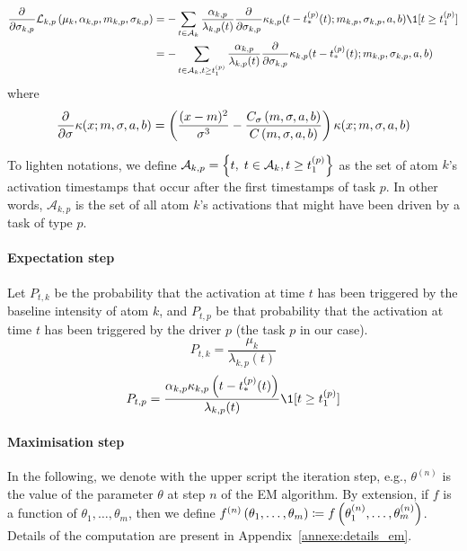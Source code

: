 \begin{equation}
\begin{split}
    \partiald{}{\sigma_{k,p}}\mathcal{L}_{k,p}\pars{\mu_k, \alpha_{k,p}, m_{k,p}, \sigma_{k,p}} &= -\sum_{t\in\mathcal{A}_k}\frac{\alpha_{k,p}}{\lambda_{k,p}(t)}\partiald{}{\sigma_{k,p}}\kappa_{k,p}(t - t_*^{(p)}(t); m_{k,p}, \sigma_{k,p}, a, b)\1[t \geq t_1^{(p)}] \\
    &= -\sum_{t\in\mathcal{A}_k, t \geq t_1^{(p)}}\frac{\alpha_{k,p}}{\lambda_{k,p}(t)}\partiald{}{\sigma_{k,p}}\kappa_{k,p}(t - t_*^{(p)}(t); m_{k,p}, \sigma_{k,p}, a, b)
\end{split}
\end{equation}
where
\begin{equation}
    \frac{\partial^{}}{\partial {\sigma}^{}}\kappa(x ; m, \sigma, a, b) = \left( \frac{(x-m)^2}{\sigma^3} - \frac{C_\sigma\left( m, \sigma,a,b \right)}{C\left( m, \sigma,a,b \right)} \right)\kappa(x ; m, \sigma, a, b)
\end{equation}

To lighten notations, we define $\mathcal{A}_{k,p} = \left\lbrace t,\; t\in\mathcal{A}_k, t \geq t_1^{(p)} \right\rbrace$ as the set of atom $k$'s activation timestamps that occur after the first timestamps of task $p$.
In other words, $\mathcal{A}_{k,p}$ is the set of all atom $k$'s activations that might have been driven by a task of type $p$.

\paragraph{Expectation step}
Let $P_{t,k}$ be the probability that the activation at time $t$ has been triggered by the baseline intensity of atom $k$, and $P_{t,p}$ be that probability that the activation at time $t$ has been triggered by the driver $p$ (the task $p$ in our case).
\begin{equation}
    P_{t,k} = \frac{\mu_k}{\lambda_{k,p}(t)}
\end{equation}
\begin{equation}
    P_{t,p} = \frac{\alpha_{k,p}\kappa_{k,p}\pars{t - t_*^{(p)}(t)}}{\lambda_{k,p}(t)}\1[t \geq t_1^{(p)}]
\end{equation}

\paragraph{Maximisation step} 
In the following, we denote with the upper script the iteration step, e.g., $\theta^{(n)}$ is the value of the parameter $\theta$ at step $n$ of the EM algorithm.
By extension, if $f$ is a function of $\theta_1, \dots, \theta_m$, then we define $f^{(n)}\left( \theta_1, \dots, \theta_m \right) \coloneqq f\left( \theta_1^{(n)}, \dots, \theta_m^{(n)} \right)$.
Details of the computation are present in Appendix~\ref{annexe:details_em}.

